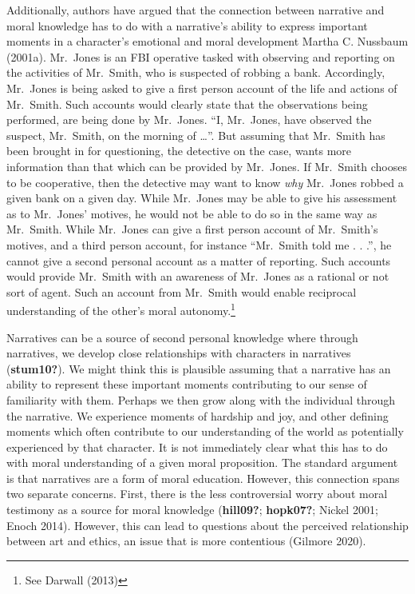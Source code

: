 \documentclass[12pt]{book}
\theoremstyle{definition}
\theoremstyle{remark}
\begin{document}
Additionally, authors have argued that the connection between narrative and moral knowledge has to do with a narrative's ability to express important moments in a character's emotional and moral development Martha C. Nussbaum (2001a). Mr.~Jones is an FBI operative tasked with observing and reporting on the activities of Mr.~Smith, who is suspected of robbing a bank. Accordingly, Mr.~Jones is being asked to give a first person account of the life and actions of Mr.~Smith. Such accounts would clearly state that the observations being performed, are being done by Mr.~Jones. ``I, Mr.~Jones, have observed the suspect, Mr.~Smith, on the morning of \ldots{}''. But assuming that Mr.~Smith has been brought in for questioning, the detective on the case, wants more information than that which can be provided by Mr.~Jones. If Mr.~Smith chooses to be cooperative, then the detective may want to know \emph{why} Mr.~Jones robbed a given bank on a given day. While Mr.~Jones may be able to give his assessment as to Mr.~Jones' motives, he would not be able to do so in the same way as Mr.~Smith. While Mr.~Jones can give a first person account of Mr.~Smith's motives, and a third person account, for instance ``Mr.~Smith told me . . .'', he cannot give a second personal account as a matter of reporting. Such accounts would provide Mr.~Smith with an awareness of Mr.~Jones as a rational or not sort of agent. Such an account from Mr.~Smith would enable reciprocal understanding of the other's moral autonomy.\footnote{See Darwall (2013)}

Narratives can be a source of second personal knowledge where through narratives, we develop close relationships with characters in narratives (\textbf{stum10?}). We might think this is plausible assuming that a narrative has an ability to represent these important moments contributing to our sense of familiarity with them. Perhaps we then grow along with the individual through the narrative. We experience moments of hardship and joy, and other defining moments which often contribute to our understanding of the world as potentially experienced by that character. It is not immediately clear what this has to do with moral understanding of a given moral proposition. The standard argument is that narratives are a form of moral education. However, this connection spans two separate concerns. First, there is the less controversial worry about moral testimony as a source for moral knowledge (\textbf{hill09?}; \textbf{hopk07?}; Nickel 2001; Enoch 2014). However, this can lead to questions about the perceived relationship between art and ethics, an issue that is more contentious (Gilmore 2020).
\end{document}
